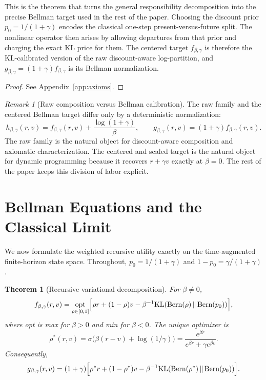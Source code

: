 \documentclass{article}
\newtheorem{theorem}{Theorem}[section]
\theoremstyle{remark}
\newtheorem{remark}[remark]{Remark}
\DeclareMathOperator{\Bern}{Bern}
\newcommand{\KL}{\mathrm{KL}}
\newcommand{\fbg}{f_{\beta,\gamma}}
\newcommand{\gbg}{g_{\beta,\gamma}}
\newcommand{\pprior}{p_0}
\newcommand{\KLbin}[2]{\KL\!\left(\Bern(#1)\,\middle\|\,\Bern(#2)\right)}
\begin{document}
This is the theorem that turns the general responsibility decomposition into the precise Bellman target used in the rest of the paper.
Choosing the discount prior $p_0=1/(1+\gamma)$ encodes the classical one-step present-versus-future split.
The nonlinear operator then arises by allowing departures from that prior and charging the exact KL price for them.
The centered target $f_{\beta,\gamma}$ is therefore the KL-calibrated version of the raw discount-aware log-partition, and $g_{\beta,\gamma}=(1+\gamma)f_{\beta,\gamma}$ is its Bellman normalization.

\begin{proof}
See Appendix~\ref{app:axioms}.
\end{proof}

\begin{remark}[Raw composition versus Bellman calibration]
\label{rem:raw-vs-centered}
The raw family and the centered Bellman target differ only by a deterministic normalization:
\[
 h_{\beta,\gamma}(r,v)=f_{\beta,\gamma}(r,v)+\frac{\log(1+\gamma)}{\beta},
 \qquad
 g_{\beta,\gamma}(r,v)=(1+\gamma)f_{\beta,\gamma}(r,v).
\]
The raw family is the natural object for discount-aware composition and axiomatic characterization.
The centered and scaled target is the natural object for dynamic programming because it recovers $r+\gamma v$ exactly at $\beta=0$.
The rest of the paper keeps this division of labor explicit.
\end{remark}

\section{Bellman Equations and the Classical Limit}
\label{sec:bellman}

We now formulate the weighted recursive utility exactly on the time-augmented finite-horizon state space.
Throughout, $\pprior=1/(1+\gamma)$ and $1-\pprior=\gamma/(1+\gamma)$.

\begin{theorem}[Recursive variational decomposition]
\label{thm:recursive-decomposition}
For $\beta\neq 0$,
\begin{equation}
\fbg(r,v)
=
\underset{\rho\in[0,1]}{\mathrm{opt}}
\Bigl[\rho r + (1-\rho)v - \beta^{-1}\KLbin{\rho}{\pprior}\Bigr],
\label{eq:recursive-var}
\end{equation}
where \textnormal{opt} is \textnormal{max} for $\beta>0$ and \textnormal{min} for $\beta<0$.
The unique optimizer is
\[
\rho^*(r,v)=\sigma\!\bigl(\beta(r-v)+\log(1/\gamma)\bigr)
= \frac{e^{\beta r}}{e^{\beta r}+\gamma e^{\beta v}}.
\]
Consequently,
\[
\gbg(r,v)=(1+\gamma)\Bigl[\rho^* r + (1-\rho^*)v - \beta^{-1}\KLbin{\rho^*}{\pprior}\Bigr].
\]
\end{theorem}
\end{document}
